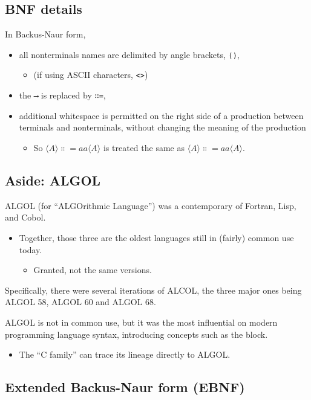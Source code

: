 \documentclass[11pt]{article}
\theoremstyle{definition}
\begin{document}
\subsection{BNF details}
\label{sec:org5542c83}

In Backus-Naur form,
\begin{itemize}
\item all nonterminals names are delimited by
angle brackets, \texttt{⟨⟩},
\begin{itemize}
\item (if using ASCII characters, \texttt{<>})
\end{itemize}
\item the \texttt{⟶} is replaced by \texttt{∷=},
\item additional whitespace is permitted on the right side
of a production between terminals and nonterminals,
without changing the meaning of the production
\begin{itemize}
\item So \(⟨A⟩ ∷= a a ⟨A⟩\) is treated the same as \(⟨A⟩ ∷= aa⟨A⟩\).
\end{itemize}
\end{itemize}

\subsection{Aside: ALGOL}
\label{sec:org8eb6bee}

ALGOL (for “ALGOrithmic Language”)
was a contemporary of Fortran, Lisp, and Cobol.
\begin{itemize}
\item Together, those three are the oldest languages
still in (fairly) common use today.
\begin{itemize}
\item Granted, not the same versions.
\end{itemize}
\end{itemize}

Specifically, there were several iterations of ALCOL,
the three major ones being ALGOL 58, ALGOL 60 and ALGOL 68.

ALGOL is not in common use, but it was
the most influential on modern programming language syntax,
introducing concepts such as the block.
\begin{itemize}
\item The “C family” can trace its lineage directly to ALGOL.
\end{itemize}

\subsection{Extended Backus-Naur form (EBNF)}
\label{sec:orgae85fa7}
\end{document}
